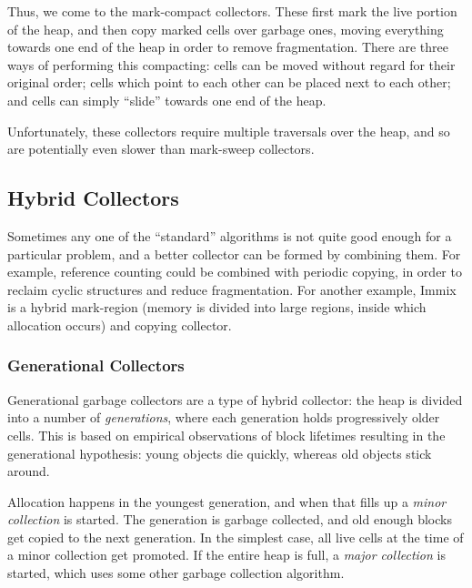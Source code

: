 Thus, we come to the mark-compact collectors. These first mark the
live portion of the heap, and then copy marked cells over garbage
ones, moving everything towards one end of the heap in order to remove
fragmentation. There are three ways of performing this
compacting: cells can be moved without regard for their original
order; cells which point to each other can be placed next to each
other; and cells can simply ``slide'' towards one end of the
heap.

Unfortunately, these collectors require multiple traversals over the
heap, and so are potentially even slower than mark-sweep
collectors\cite{GarbageCollection}.

\subsection{Hybrid Collectors}
\label{sec:lit-gc-hybrid}

Sometimes any one of the ``standard'' algorithms is not quite good
enough for a particular problem, and a better collector can be formed
by combining them. For example, reference counting could be combined
with periodic copying, in order to reclaim cyclic structures and
reduce fragmentation. For another example, Immix\cite{Blackburn08} is
a hybrid mark-region (memory is divided into large regions, inside
which allocation occurs) and copying collector.

\subsubsection{Generational Collectors}
\label{sec:lit-gc-hybrid-generational}

Generational garbage collectors are a type of hybrid collector: the
heap is divided into a number of \textit{generations}, where each
generation holds progressively older cells. This is based on empirical
observations of block lifetimes resulting in the generational
hypothesis: young objects die quickly, whereas old objects stick
around\cite{Ungar84}.

Allocation happens in the youngest generation, and when that fills up
a \textit{minor collection} is started. The generation is garbage
collected, and old enough blocks get copied to the next
generation. In the simplest case, all live cells at the
time of a minor collection get promoted. If the entire heap is full, a
\textit{major collection} is started, which uses some other garbage
collection algorithm\cite{GarbageCollection}.


